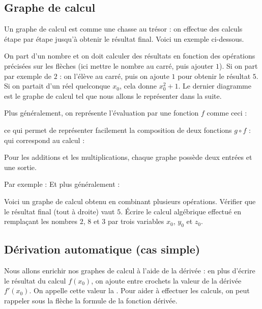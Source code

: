 \documentclass[11pt,class=report,crop=false]{standalone}
\begin{document}
\subsection{Graphe de calcul}


Un graphe de calcul est comme une chasse au trésor : on effectue des calculs étape par étape jusqu'à obtenir le résultat final.
Voici un exemple ci-dessous. 


On part d'un nombre et on doit calculer des résultats en fonction des opérations précisées sur les flèches (ici mettre le nombre au carré, puis ajouter $1$). Si on part par exemple de $2$ : on l'élève au carré, puis on ajoute $1$ pour obtenir le résultat $5$.
Si on partait d'un réel quelconque $x_0$, cela donne $x_0^2+1$.
Le dernier diagramme est le graphe de calcul tel que nous allons le représenter dans la suite.


Plus généralement, on représente l'évaluation par une fonction $f$ comme ceci :

ce qui permet de représenter facilement la composition de deux fonctions $g\circ f$ :
qui correspond au calcul :


Pour les additions et les multiplications, chaque graphe possède deux entrées et une sortie.

Par exemple :
Et plus généralement :

Voici un graphe de calcul obtenu en combinant plusieurs opérations. Vérifier que le résultat final (tout à droite) vaut $5$. \'Ecrire le calcul algébrique effectué en remplaçant les nombres $2$, $8$ et $3$ par trois variables $x_0$, $y_0$ et $z_0$.

\subsection{Dérivation automatique (cas simple)}

Nous allons enrichir nos graphes de calcul à l'aide de la dérivée : en plus d'écrire le résultat du calcul $f(x_0)$, on ajoute entre crochets la valeur de la dérivée $f'(x_0)$. On appelle cette valeur la . Pour aider à effectuer les calculs, on peut rappeler sous la flèche la formule de la fonction dérivée.
\end{document}
